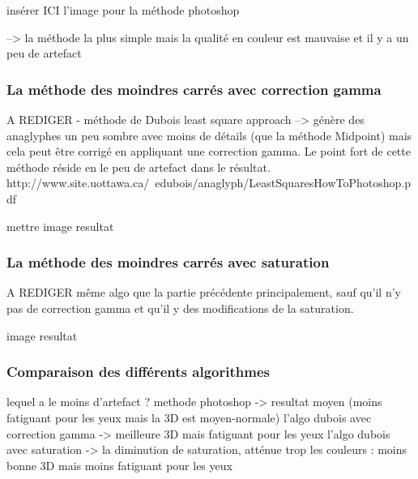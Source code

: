 	 insérer ICI l'image pour la méthode photoshop
	

	--> la méthode la plus simple mais la qualité en couleur est mauvaise et il y a un peu de artefact
\subsubsection{La méthode des moindres carrés avec correction gamma}
A REDIGER
- méthode de Dubois least square approach
--> génère des anaglyphes un peu sombre avec moins de détails (que la méthode Midpoint) mais cela peut être corrigé en appliquant une correction gamma. Le point fort de cette méthode réside en le peu de artefact dans le résultat.
http://www.site.uottawa.ca/~edubois/anaglyph/LeastSquaresHowToPhotoshop.pdf

mettre image resultat

\subsubsection{La méthode des moindres carrés avec saturation}
A REDIGER
même algo que la partie précédente principalement, sauf qu'il n'y pas de correction gamma et qu'il y des modifications de la saturation.

image resultat

\subsubsection{Comparaison des différents algorithmes}

lequel a le moins d'artefact ?
methode photoshop -> resultat moyen (moins fatiguant pour les yeux mais la 3D est moyen-normale)
l'algo dubois avec correction gamma -> meilleure 3D mais fatiguant pour les yeux
l'algo dubois avec saturation -> la diminution de saturation, atténue trop les couleurs : moins bonne 3D mais moins fatiguant pour les yeux 




